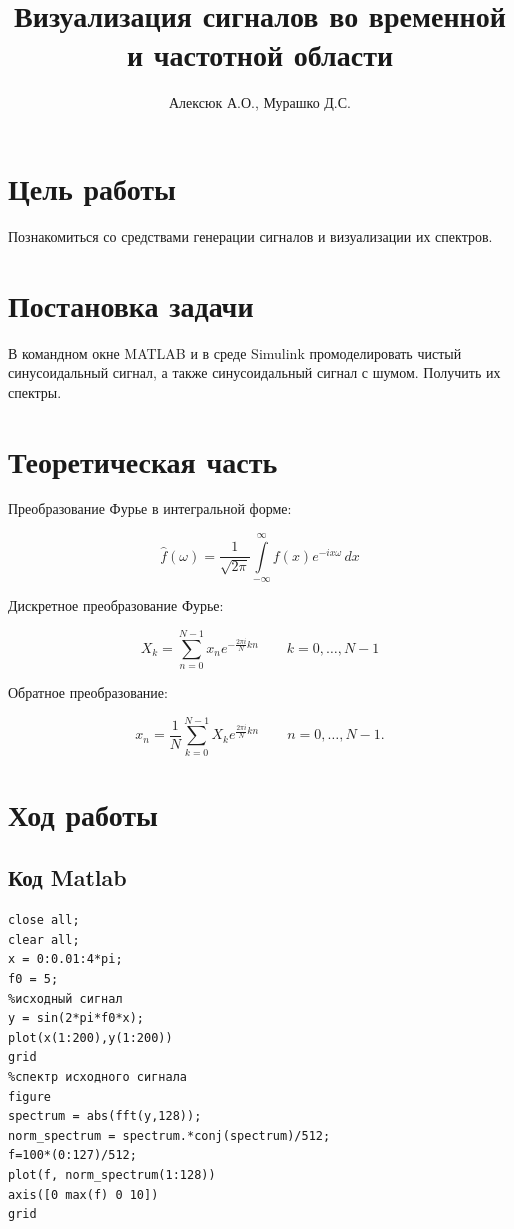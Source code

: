 \documentclass[a4paper, 12pt]{article}
\author{Алексюк А.О., Мурашко Д.С.}
\title{Визуализация сигналов во временной и частотной области}
\begin{document}
\maketitle
\tableofcontents
\pagebreak

\section{Цель работы}
Познакомиться со средствами генерации сигналов и визуализации их спектров.

\section{Постановка задачи}
В командном окне MATLAB и в среде Simulink промоделировать чистый синусоидальный сигнал, а также синусоидальный сигнал с шумом. Получить их спектры.

\section{Теоретическая часть}

Преобразование Фурье в интегральной форме:

$$\hat{f}(\omega)=\frac{1}{\sqrt{2\pi}}\int\limits_{-\infty}^{\infty}f(x)e^{-ix\omega}\,dx$$

Дискретное преобразование Фурье:

$$X_k = \sum_{n=0}^{N-1} x_n e^{-\frac{2 \pi i}{N} k n} \qquad k = 0, \dots, N-1$$

Обратное преобразование:

$$x_n = \frac{1}{N} \sum_{k=0}^{N-1} X_k e^{\frac{2\pi i}{N} k n} \quad \quad n = 0,\dots,N-1.$$

\section{Ход работы}

\subsection{Код Matlab}
\begin{lstlisting}
close all;
clear all;
x = 0:0.01:4*pi;
f0 = 5;
%исходный сигнал
y = sin(2*pi*f0*x);
plot(x(1:200),y(1:200))
grid
%спектр исходного сигнала 
figure
spectrum = abs(fft(y,128)); 
norm_spectrum = spectrum.*conj(spectrum)/512;
f=100*(0:127)/512;
plot(f, norm_spectrum(1:128))
axis([0 max(f) 0 10])
grid
\end{lstlisting}
\end{document}
